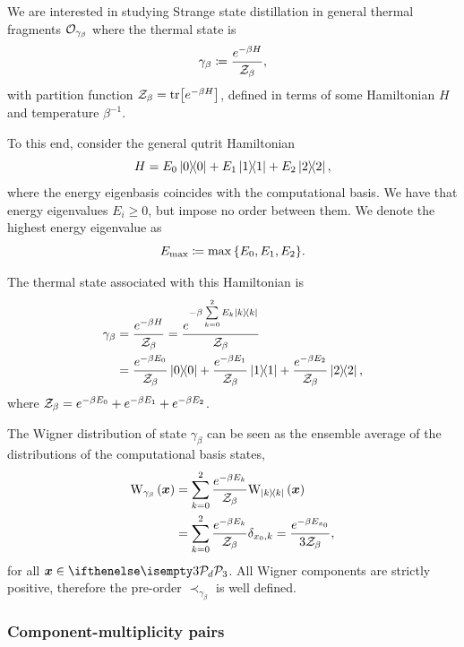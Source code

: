 \documentclass[pra,
aps,
twocolumn,
superscriptaddress,
groupedaddress,
nofootinbib,
reprint
]{revtex4-1}
\begin{document}
We are interested in studying Strange state distillation in general thermal fragments $\mathcal{O}_{\gamma_\beta}$ where the thermal state is
\begin{equation}
	\gamma_\beta \coloneqq \frac{e^{-\beta H}}{\mathcal{Z}_\beta},
\end{equation}
with partition function $\mathcal{Z}_\beta = {\rm{tr}} \big[e^{-\beta H} \big]$, defined in terms of some Hamiltonian $H$ and temperature $\beta^{-1}$.

To this end, consider the general qutrit Hamiltonian
\begin{equation}
	H = E_0 \ketbra{0} + E_1 \ketbra{1} + E_2 \ketbra{2},
\end{equation}
where the energy eigenbasis coincides with the computational basis.
We have that energy eigenvalues $E_i \geq 0$, but impose no order between them.
We denote the highest energy eigenvalue as
\begin{equation}
	E_{\rm{max}} \coloneqq \max{\{E_0, E_1, E_2\}}.
\end{equation}

The thermal state associated with this Hamiltonian is
\begin{align}
	\gamma_\beta &= \frac{e^{-\beta H}}{\mathcal{Z}_\beta} = \frac{e^{-\beta \sum\limits_{k=0}^2 E_k \ketbra{k}}}{\mathcal{Z}_\beta} \\
	&= \frac{e^{-\beta E_0}}{\mathcal{Z}_\beta}\ketbra{0} + \frac{e^{-\beta E_1}}{\mathcal{Z}_\beta}\ketbra{1} + \frac{e^{-\beta E_2}}{\mathcal{Z}_\beta}\ketbra{2},
\end{align}
where $\mathcal{Z}_\beta = e^{-\beta E_0} + e^{-\beta E_1} + e^{-\beta E_2}$.

The Wigner distribution of state $\gamma_\beta$ can be seen as the ensemble average of the distributions of the computational basis states,
\begin{align}
	\W[\bmx]{\gamma_\beta} &= \sum\limits_{k=0}^2 \frac{e^{-\beta E_k}}{\Z_\beta}\W[\bmx]{\ketbra{k}} \\
	&= \sum\limits_{k=0}^2 \frac{e^{-\beta E_k}}{\Z_\beta} \delta_{x_0, k} = \frac{e^{-\beta E_{x_0}}}{3\Z_\beta},
\end{align}
for all $\bmx \in \pd[3]$. 
All Wigner components are strictly positive, therefore the pre-order $\prec_{\gamma_\beta}$ is well defined.

\subsubsection{Component-multiplicity pairs}

\end{document}
